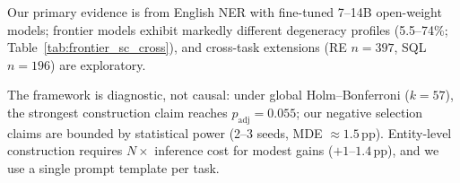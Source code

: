 Our primary evidence is from English NER with fine-tuned 7--14B open-weight models; frontier models exhibit markedly different degeneracy profiles (5.5--74\%; Table~\ref{tab:frontier_sc_cross}), and cross-task extensions (RE $n{=}397$, SQL $n{=}196$) are exploratory.

The framework is diagnostic, not causal: under global Holm--Bonferroni ($k{=}57$), the strongest construction claim reaches $p_{\text{adj}}{=}0.055$; our negative selection claims are bounded by statistical power (2--3 seeds, MDE ${\approx}1.5$\,pp).
Entity-level construction requires $N{\times}$ inference cost for modest gains ($+1$--$1.4$\,pp), and we use a single prompt template per task.

